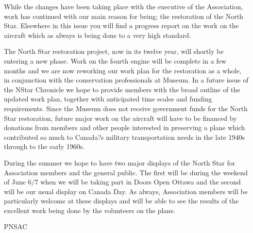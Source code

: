 While the changes have been taking place with the executive of the Association, work has continued with our main reason for being; the restoration of the North Star. Elsewhere in this issue you will find a progress report on the work on the aircraft which as always is being done to a very high standard.

The North Star restoration project, now in its twelve year, will shortly be entering a new phase. 
Work on the fourth engine will be complete in a few months and we are now reworking our work plan 
for the restoration as a whole, in conjunction with the conservation professionals at Museum. In 
a future issue of the NStar Chronicle we hope to provide members with the broad outline of the 
updated work plan, together with anticipated time scales and funding requirements. Since the Museum does not receive government funds for the North Star restoration, future major work on the aircraft will have to be financed by donations from members and other people interested in preserving a plane which contributed so much to Canada?s military transportation needs in the late 1940s through to the early 1960s.

During the summer we hope to have two major displays of the North Star for Association members and the general public. The first will be during the weekend of June 6/7 when we will be taking part in Doors Open Ottawa and the second will be our usual display on Canada Day. As always, Association members will be particularly welcome at these displays and will be able to see the results of the excellent work being done by the volunteers on the plane.



\begin{footnotesize}
    \raggedleft PNSAC\\
\end{footnotesize}



